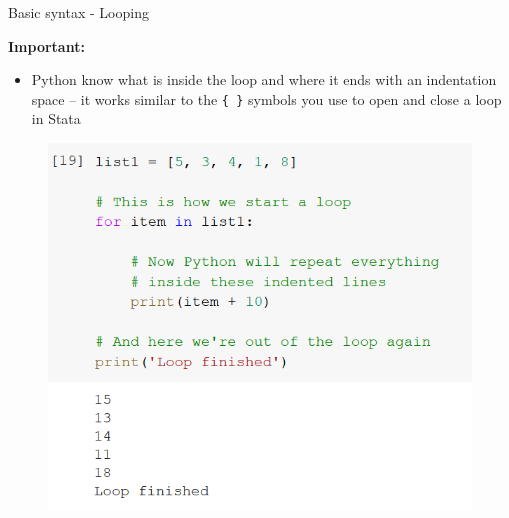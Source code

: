 \documentclass[aspectratio=169]{beamer}
\begin{document}
\begin{frame}{Basic syntax - Looping}

	\textbf{Important:}

	\begin{multicols}{2}

		\begin{itemize}	
			\item Python know what is inside the loop and where it ends with an indentation space -- it works similar to the \texttt{\{ \}} symbols you use to open and close a loop in Stata
		\end{itemize}
		\begin{figure}
			\centering
			\includegraphics[width=\linewidth]{img/list_loop.png}
		\end{figure}

	\end{multicols}

\end{frame}
\end{document}
